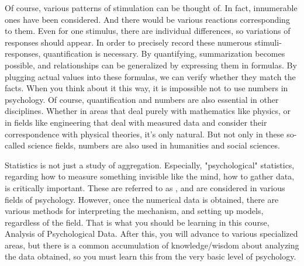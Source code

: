 \documentclass{ltjsbook}
\begin{document}
Of course, various patterns of stimulation can be thought of. In fact, innumerable ones have been considered. And there would be various reactions corresponding to them. Even for one stimulus, there are individual differences, so variations of responses should appear. In order to precisely record these numerous stimuli-responses, quantification is necessary. By quantifying, summarization becomes possible, and relationships can be generalized by expressing them in formulas. By plugging actual values into these formulas, we can verify whether they match the facts. When you think about it this way, it is impossible not to use numbers in psychology. Of course, quantification and numbers are also essential in other disciplines. Whether in areas that deal purely with mathematics like physics, or in fields like engineering that deal with measured data and consider their correspondence with physical theories, it's only natural. But not only in these so-called science fields, numbers are also used in humanities and social sciences.

Statistics is not just a study of aggregation. Especially, "psychological" statistics, regarding how to measure something invisible like the mind, how to gather data, is critically important. These are referred to as , and are considered in various fields of psychology. However, once the numerical data is obtained, there are various methods for interpreting the mechanism, and setting up models, regardless of the field. That is what you should be learning in this course, Analysis of Psychological Data. After this, you will advance to various specialized areas, but there is a common accumulation of knowledge/wisdom about analyzing the data obtained, so you must learn this from the very basic level of psychology.
\end{document}
